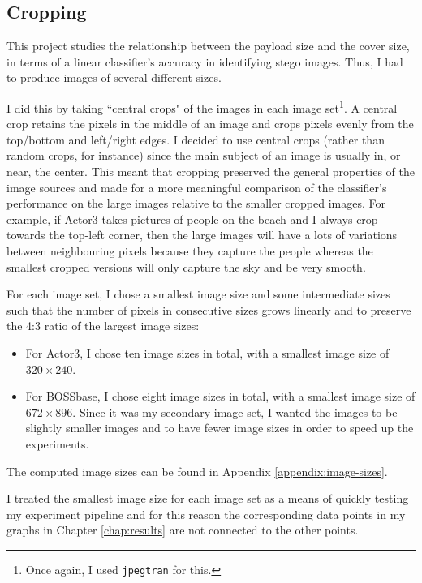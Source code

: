 \documentclass[11pt,a4paper,twoside,openright]{report}
\begin{document}
\subsection{Cropping} \label{sec:cropping}
This project studies the relationship between the payload size and the cover size, in terms of a linear classifier's accuracy in identifying stego images. Thus, I had to produce images of several different sizes.

I did this by taking ``central crops" of the images in each image set\footnote{Once again, I used \texttt{jpegtran} for this.}. A central crop retains the pixels in the middle of an image and crops pixels evenly from the top/bottom and left/right edges. I decided to use central crops (rather than random crops, for instance) since the main subject of an image is usually in, or near, the center. This meant that cropping preserved the general properties of the image sources and made for a more meaningful comparison of the classifier's performance on the large images relative to the smaller cropped images. For example, if Actor3 takes pictures of people on the beach and I always crop towards the top-left corner, then the large images will have a lots of variations between neighbouring pixels because they capture the people whereas the smallest cropped versions will only capture the sky and be very smooth.

For each image set, I chose a smallest image size and some intermediate sizes such that the number of pixels in consecutive sizes grows linearly and to preserve the 4:3 ratio of the largest image sizes:
\begin{itemize}
	\item For Actor3, I chose ten image sizes in total, with a smallest image size of $320\times240$.
	\item For BOSSbase, I chose eight image sizes in total, with a smallest image size of $672\times896$. Since it was my secondary image set, I wanted the images to be slightly smaller images and to have fewer image sizes in order to speed up the experiments.
\end{itemize}

The computed image sizes can be found in Appendix \ref{appendix:image-sizes}.

I treated the smallest image size for each image set as a means of quickly testing my experiment pipeline and for this reason the corresponding data points in my graphs in Chapter \ref{chap:results} are not connected to the other points.
\end{document}
